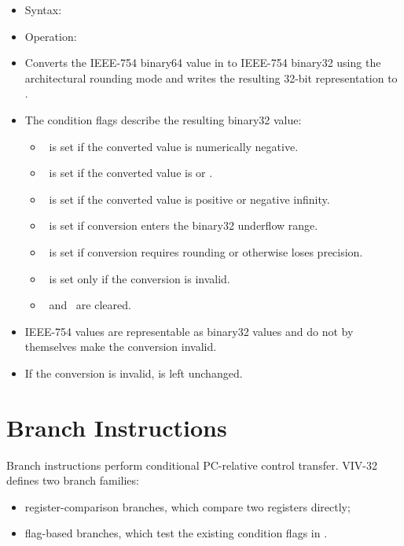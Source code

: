 \begin{itemize}
\item Syntax: 
\item Operation: 
\item Converts the IEEE-754 binary64 value in  to IEEE-754
      binary32 using the architectural rounding mode and writes the resulting
      32-bit representation to .
\item The condition flags describe the resulting binary32 value:
      \begin{itemize}
      \item \flagN\ is set if the converted value is numerically negative.
      \item \flagZ\ is set if the converted value is  or .
      \item \flagI\ is set if the converted value is positive or negative infinity.
      \item \flagU\ is set if conversion enters the binary32 underflow range.
      \item \flagX\ is set if conversion requires rounding or otherwise loses precision.
      \item \flagE\ is set only if the conversion is invalid.
      \item \flagC\ and \flagV\ are cleared.
      \end{itemize}
\item IEEE-754  values are representable as binary32 values and do
      not by themselves make the conversion invalid.
\item If the conversion is invalid,  is left unchanged.
\end{itemize}

\section{Branch Instructions}

Branch instructions perform conditional PC-relative control transfer. VIV-32
defines two branch families:

\begin{itemize}
  \item register-comparison branches, which compare two registers directly;
  \item flag-based branches, which test the existing condition flags in
  .
\end{itemize}

